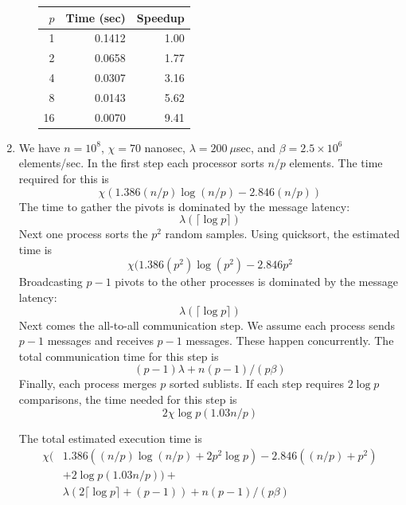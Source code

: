\begin{enumerate}
\begin{enumerate}
\begin{tabular}{|r|r|r|}
\hline
$p$ & Time (sec) & Speedup \\
\hline
1 &  0.1412 & 1.00 \\
2 &  0.0658 & 1.77 \\
4 &  0.0307 & 3.16 \\
8 &  0.0143 & 5.62 \\
16 & 0.0070 & 9.41 \\
\hline
\end{tabular}
\end{enumerate}

\item
We have $n = 10^8$, $\chi = 70$ nanosec, $\lambda = 200\ \mu$sec,
and $\beta = 2.5\times 10^6$ elements/sec.
In the first step each processor sorts $n/p$ elements.
The time required for this is
$$\chi(1.386(n/p)\log(n/p) - 2.846(n/p))$$
The time to gather the pivots is dominated by the message latency:
$$\lambda(\lceil\log p\rceil)$$
Next one process sorts the $p^2$ random samples.
Using quicksort, the estimated time is
$$\chi(1.386(p^2)\log(p^2) - 2.846 p^2$$
Broadcasting $p-1$ pivots to the other processes is dominated by the
message latency:
$$\lambda(\lceil\log p\rceil)$$
Next comes the all-to-all communication step. We assume each process sends
$p-1$ messages and receives $p-1$ messages. These happen concurrently.
The total communication time for this step is
$$(p-1)\lambda + n(p-1)/(p\beta)$$
Finally, each process merges $p$ sorted sublists.
If each step requires $2\log p$ comparisons, the time needed for this
step is
$$2\chi\log p(1.03n/p)$$

The total estimated execution time is
\begin{equation*}
\begin{aligned}
\chi(&1.386((n/p)\log(n/p) + 2p^2\log p) - 2.846((n/p) + p^2)\\
     &+ 2\log p(1.03n/p)) +\\
&\lambda(2\lceil\log p\rceil + (p-1)) + n(p-1)/(p\beta)
\end{aligned}
\end{equation*}


\end{enumerate}
